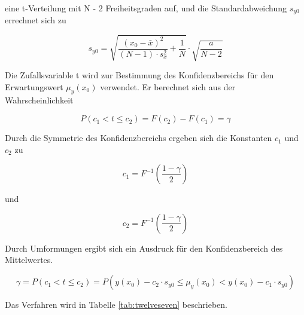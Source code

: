 \noindent eine t-Verteilung mit N - 2 Freiheitsgraden auf, und die Standardabweichung $s_{y0}$ errechnet sich zu

\begin{equation}\label{eq:twelveeightynine}
s_{y0} =\sqrt{\dfrac{(x_{0} -\bar{x})^{2}}{(N-1)\cdot s_{x}^{2}} +\dfrac{1}{N}} \cdot \sqrt{\dfrac{a}{N-2}}
\end{equation}

\noindent Die Zufallsvariable t wird zur Bestimmung des Konfidenzbereichs f\"{u}r den Erwartungswert $\mu_{y}(x_{0})$ verwendet. Er berechnet sich aus der Wahrscheinlichkeit

\begin{equation}\label{eq:twelveninety}
P(c_{1} <t\le c_{2})=F(c_{2})-F(c_{1})=\gamma
\end{equation}

\noindent Durch die Symmetrie des Konfidenzbereichs ergeben sich die Konstanten $c_{1}$ und $c_{2}$ zu

\begin{equation}\label{eq:twelveninetyone}
c_{1} =F^{-1} \left(\dfrac{1-\gamma }{2} \right)
\end{equation}

\noindent und

\begin{equation}\label{eq:twelveninetytwo}
c_{2} =F^{-1} \left(\dfrac{1-\gamma }{2} \right)
\end{equation}

\noindent Durch Umformungen ergibt sich ein Ausdruck f\"{u}r den Konfidenzbereich des Mittelwertes.

\begin{equation}\label{eq:twelveninetythree}
\gamma =P(c_{1} <t\le c_{2})=P\left(y(x_{0})-c_{2} \cdot s_{y0} \le \mu _{y} (x_{0})<y(x_{0})-c_{1} \cdot s_{y0} \right)
\end{equation}

\noindent Das Verfahren wird in Tabelle \ref{tab:twelveseven} beschrieben.


